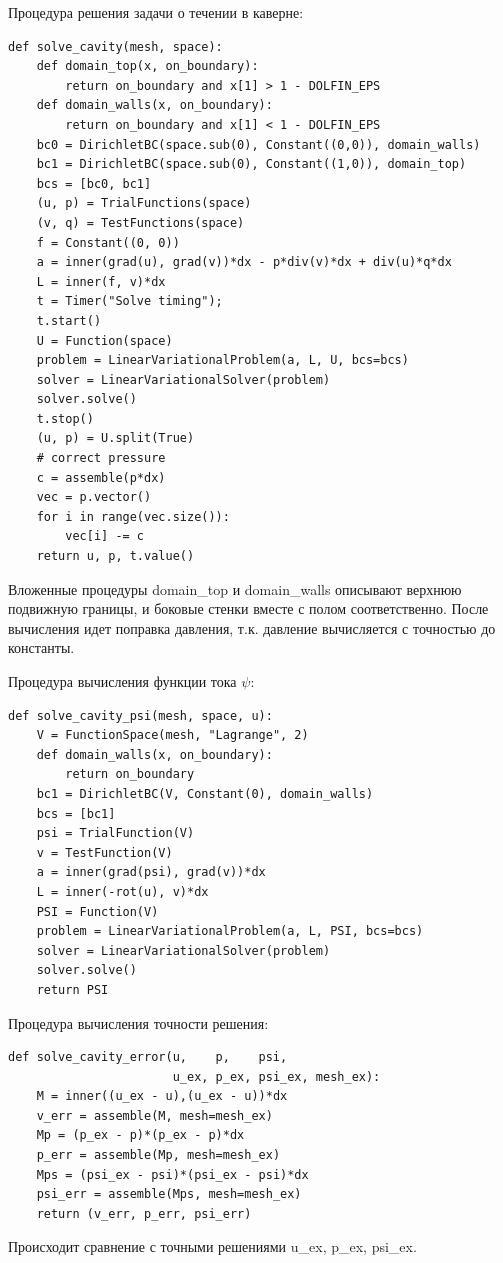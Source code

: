 \documentclass[12pt]{article}
\begin{document}
Процедура решения задачи о течении в каверне: 
\begin{lstlisting}       
def solve_cavity(mesh, space):
    def domain_top(x, on_boundary):
        return on_boundary and x[1] > 1 - DOLFIN_EPS  
    def domain_walls(x, on_boundary):
        return on_boundary and x[1] < 1 - DOLFIN_EPS    
    bc0 = DirichletBC(space.sub(0), Constant((0,0)), domain_walls)
    bc1 = DirichletBC(space.sub(0), Constant((1,0)), domain_top)
    bcs = [bc0, bc1]    
    (u, p) = TrialFunctions(space)
    (v, q) = TestFunctions(space)
    f = Constant((0, 0))       
    a = inner(grad(u), grad(v))*dx - p*div(v)*dx + div(u)*q*dx
    L = inner(f, v)*dx    
    t = Timer("Solve timing");
    t.start()            
    U = Function(space)
    problem = LinearVariationalProblem(a, L, U, bcs=bcs)
    solver = LinearVariationalSolver(problem)
    solver.solve()    
    t.stop()    
    (u, p) = U.split(True)        
    # correct pressure
    c = assemble(p*dx)
    vec = p.vector()
    for i in range(vec.size()):
        vec[i] -= c
    return u, p, t.value()
\end{lstlisting}
Вложенные процедуры domain\_top и domain\_walls описывают верхнюю подвижную границы, и боковые стенки вместе с полом соответственно. После вычисления идет поправка давления, т.к. давление вычисляется с точностью до константы.

Процедура вычисления функции тока $\psi$:
\begin{lstlisting}
def solve_cavity_psi(mesh, space, u):
    V = FunctionSpace(mesh, "Lagrange", 2)
    def domain_walls(x, on_boundary):
        return on_boundary
    bc1 = DirichletBC(V, Constant(0), domain_walls)    
    bcs = [bc1]
    psi = TrialFunction(V)
    v = TestFunction(V)    
    a = inner(grad(psi), grad(v))*dx
    L = inner(-rot(u), v)*dx    
    PSI = Function(V)
    problem = LinearVariationalProblem(a, L, PSI, bcs=bcs)
    solver = LinearVariationalSolver(problem)
    solver.solve()
    return PSI
\end{lstlisting}

Процедура вычисления точности решения:
\begin{lstlisting}
def solve_cavity_error(u,    p,    psi,    
                       u_ex, p_ex, psi_ex, mesh_ex):
    M = inner((u_ex - u),(u_ex - u))*dx
    v_err = assemble(M, mesh=mesh_ex)    
    Mp = (p_ex - p)*(p_ex - p)*dx
    p_err = assemble(Mp, mesh=mesh_ex)
    Mps = (psi_ex - psi)*(psi_ex - psi)*dx
    psi_err = assemble(Mps, mesh=mesh_ex)
    return (v_err, p_err, psi_err)
\end{lstlisting}
Происходит сравнение с точными решениями u\_ex, p\_ex, psi\_ex.
\end{document}
